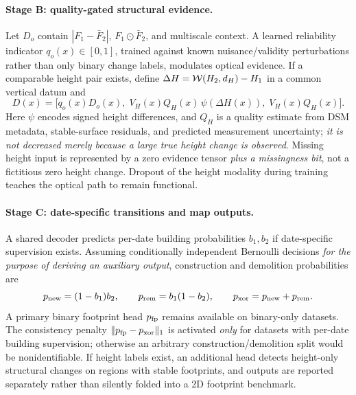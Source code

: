 \paragraph{Stage B: quality-gated structural evidence.} Let $D_o$ contain $|F_1-\bar F_2|$, $F_1\odot\bar F_2$, and multiscale context. A learned reliability indicator $q_o(x)\in[0,1]$, trained against known nuisance/validity perturbations rather than only binary change labels, modulates optical evidence. If a comparable height pair exists, define $\Delta H={\cal W}(H_2,d_H)-H_1$ in a common vertical datum and
\begin{equation}
 D(x)=\big[q_o(x)D_o(x),\;V_H(x)Q_H(x)\,\psi(\Delta H(x)),\;V_H(x)Q_H(x)\big].
 \label{eq:fusion}
\end{equation}
Here $\psi$ encodes signed height differences, and $Q_H$ is a quality estimate from DSM metadata, stable-surface residuals, and predicted measurement uncertainty; \emph{it is not decreased merely because a large true height change is observed}. Missing height input is represented by a zero evidence tensor \emph{plus a missingness bit}, not a fictitious zero height change. Dropout of the height modality during training teaches the optical path to remain functional.

\paragraph{Stage C: date-specific transitions and map outputs.} A shared decoder predicts per-date building probabilities $b_1,b_2$ if date-specific supervision exists. Assuming conditionally independent Bernoulli decisions \emph{for the purpose of deriving an auxiliary output}, construction and demolition probabilities are
\begin{equation}
 p_{\rm new}=(1-b_1)b_2,\qquad
 p_{\rm rem}=b_1(1-b_2),\qquad
 p_{\rm xor}=p_{\rm new}+p_{\rm rem}.
 \label{eq:transition}
\end{equation}
A primary binary footprint head $p_{\rm fp}$ remains available on binary-only datasets. The consistency penalty $\|p_{\rm fp}-p_{\rm xor}\|_1$ is activated \emph{only} for datasets with per-date building supervision; otherwise an arbitrary construction/demolition split would be nonidentifiable. If height labels exist, an additional head detects height-only structural changes on regions with stable footprints, and outputs are reported separately rather than silently folded into a 2D footprint benchmark.

